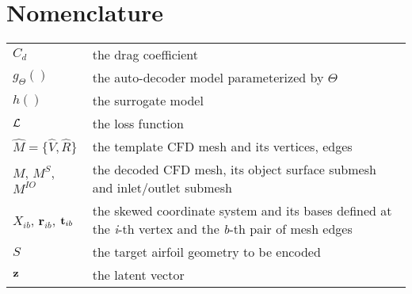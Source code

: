 \section{Nomenclature}

{\renewcommand\arraystretch{1.0}
\noindent\begin{longtable*}{@{}l @{\quad=\quad} p{0.75\textwidth}@{}}
$C_d$ & the drag coefficient \\
$g_\Theta()$ & the auto-decoder model parameterized by $\Theta$ \\
$h()$ & the surrogate model \\
$\mathcal{L}$ & the loss function \\
$\hat{M}=\{\hat{V},\hat{R}\}$ & the template CFD mesh and its vertices, edges \\
$M$, $M^S$, $M^{IO}$ & the decoded CFD mesh, its object surface submesh and inlet/outlet submesh \\
$X_{ib}$, $\mathbf{r}_{ib}$, $\mathbf{t}_{ib}$ & the skewed coordinate system and its bases defined at the \textit{i}-th vertex and the  \textit{b}-th pair of mesh edges \\
$S$ & the target airfoil geometry to be encoded \\
$\mathbf{z}$ & the latent vector \\
\end{longtable*}}